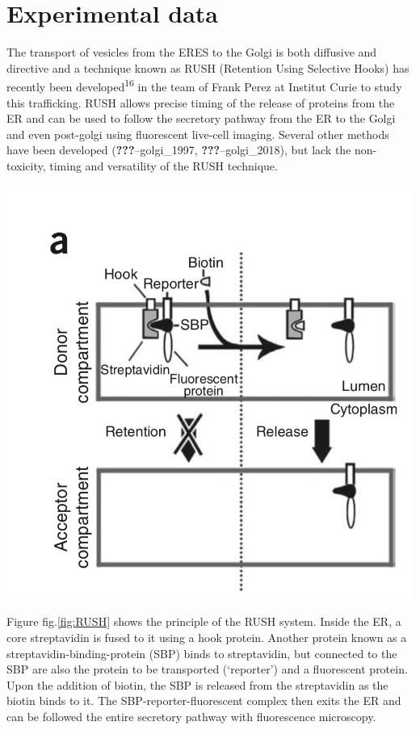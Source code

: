 \documentclass[12pt,a4paper,]{Dissertate}
\let\origfigure\figure
\let\endorigfigure\endfigure
\renewenvironment{figure}[1][2] {
    \expandafter\origfigure\expandafter[H]
} {
    \endorigfigure
}
\begin{document}
\hypertarget{experimental-data}{%
\section{Experimental data}\label{experimental-data}}

The transport of vesicles from the ERES to the Golgi is both diffusive
and directive and a technique known as RUSH (Retention Using Selective
Hooks) has recently been developed\textsuperscript{16} in the team of
Frank Perez at Institut Curie to study this trafficking. RUSH allows
precise timing of the release of proteins from the ER and can be used to
follow the secretory pathway from the ER to the Golgi and even
post-golgi using fluorescent live-cell imaging. Several other methods
have been developed (\textbf{???}--golgi\_1997,
\textbf{???}--golgi\_2018), but lack the non-toxicity, timing and
versatility of the RUSH technique.

\begin{figure}
\hypertarget{fig:RUSH}{%
\centering
\includegraphics{source/figures/png/RUSH.png}
\caption{Schematic overview of the RUSH system. Image taken from
16}\label{fig:RUSH}
}
\end{figure}

Figure fig.\ref{fig:RUSH} shows the principle of the RUSH system.
Inside the ER, a core streptavidin is fused to it using a hook protein.
Another protein known as a streptavidin-binding-protein (SBP) binds to
streptavidin, but connected to the SBP are also the protein to be
transported (`reporter') and a fluorescent protein. Upon the addition of
biotin, the SBP is released from the streptavidin as the biotin binds to
it. The SBP-reporter-fluorescent complex then exits the ER and can be
followed the entire secretory pathway with fluorescence microscopy.
\end{document}

